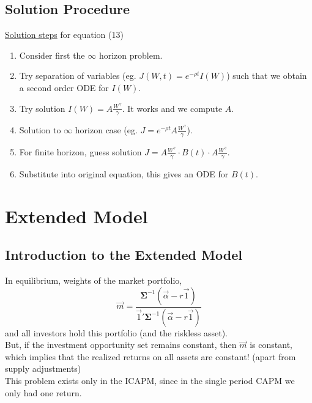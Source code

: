 \documentclass[
14pt,notheorems,hyperref={pdfauthor=whatever}
]{beamer}
\begin{document}
\subsection{Solution Procedure}
\begin{frame}
\underline{Solution steps} for equation (13)\\
\begin{enumerate}
    \item Consider first the $\infty$ horizon problem.
    \item Try separation of variables (eg. $J(W,t) = e^{-\rho t} I(W)$) such that we obtain a second order ODE for $I(W)$.
    \item Try solution $I(W) = A \frac{W^\gamma}{\gamma}$. It works and we compute $A$.
    \item Solution to $\infty$ horizon case (eg. $J = e^{-\rho t} A \frac{W^\gamma}{\gamma}$).
    \item For finite horizon, guess solution $J = A \frac{W^\gamma}{\gamma}\cdot B(t) \cdot A\frac{W^\gamma}{\gamma}$.
    \item Substitute into original equation, this gives an ODE for $B(t)$.
\end{enumerate}
\end{frame}

\section{Extended Model}

\subsection{Introduction to the Extended Model}

\begin{frame}
In equilibrium, weights of the market portfolio,\\
\[ \vec{m} = \frac{\bm{\Sigma}^{-1}(\vec{\alpha}-r\vec{1})}{\vec{1}'\bm{\Sigma}^{-1}(\vec{\alpha}-r\vec{1})} \]
and all investors hold this portfolio (and the riskless asset).\\
\hfill\break
But, if the investment opportunity set remains constant, then $\vec{m}$ is constant, which implies that the realized returns on all assets are constant! (apart from supply adjustments)\\
\hfill\break
This problem exists only in the ICAPM, since in the single period CAPM we only had one return.
\end{frame}
\end{document}
